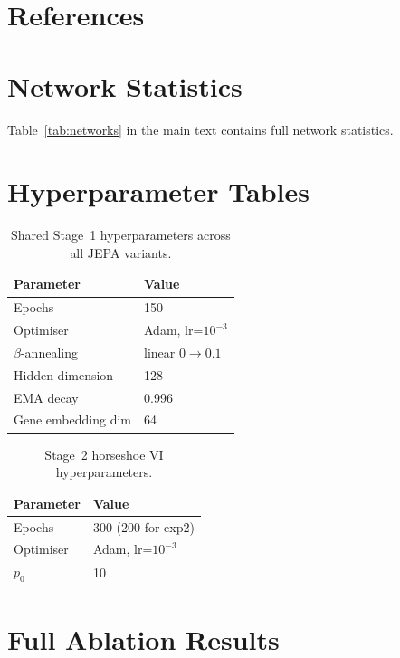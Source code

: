 \documentclass[11pt]{article}
\begin{document}
\section*{References}



\appendix

\section{Network Statistics}
\label{app:networks}

Table~\ref{tab:networks} in the main text contains full network statistics.

\section{Hyperparameter Tables}
\label{app:hyperparams}

\begin{table}[h]
\centering
\caption{Shared Stage~1 hyperparameters across all JEPA variants.}
\begin{tabular}{ll}
\toprule
Parameter & Value \\
\midrule
Epochs & 150 \\
Optimiser & Adam, lr=$10^{-3}$ \\
$\beta$-annealing & linear $0 \to 0.1$ \\
Hidden dimension & 128 \\
EMA decay & 0.996 \\
Gene embedding dim & 64 \\
\bottomrule
\end{tabular}
\end{table}

\begin{table}[h]
\centering
\caption{Stage~2 horseshoe VI hyperparameters.}
\begin{tabular}{ll}
\toprule
Parameter & Value \\
\midrule
Epochs & 300 (200 for exp2) \\
Optimiser & Adam, lr=$10^{-3}$ \\
$p_0$ & 10 \\
\bottomrule
\end{tabular}
\end{table}

\section{Full Ablation Results}
\label{app:ablations}
\end{document}
